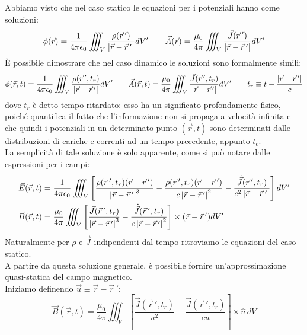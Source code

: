 \documentclass[]{article}
\begin{document}
Abbiamo visto che nel caso statico le equazioni per i potenziali hanno come soluzioni:
\begin{equation}
	\phi(\vec{r}) = \frac{1}{4\pi\epsilon_0} \iiint_V \frac{\rho(\vec{r}\,')}{\left\lvert\vec{r} - \vec{r}\,'\right\rvert} dV' \qquad \vec{A}(\vec{r}) = \frac{\mu_0}{4\pi} \iiint_V \frac{\vec{J}(\vec{r}\,')}{\left\lvert\vec{r} - \vec{r}\,'\right\rvert} dV'
	\label{eq:84}
\end{equation}
È possibile dimostrare che nel caso dinamico le soluzioni sono formalmente simili:
\begin{equation}
	\phi(\vec{r},t) = \frac{1}{4\pi\epsilon_0} \iiint_V \frac{\rho(\vec{r}\,', t_r)}{\left\lvert\vec{r} - \vec{r}\,'\right\rvert} dV' \qquad \vec{A}(\vec{r},t) = \frac{\mu_0}{4\pi} \iiint_V \frac{\vec{J}(\vec{r}\,',t_r)}{\left\lvert\vec{r} - \vec{r}\,'\right\rvert} dV' \qquad t_r \equiv t - \frac{\left\lvert\vec{r} - \vec{r}\,'\right\rvert}{c}
	\label{eq:85}
\end{equation}
dove $ t_r $ è detto tempo ritardato: esso ha un significato profondamente fisico, poiché quantifica il fatto che l'informazione non si propaga a velocità infinita e che quindi i potenziali in un determinato punto $ (\vec{r},t) $ sono determinati dalle distribuzioni di cariche e correnti ad un tempo precedente, appunto $ t_c $. \\ 
%
La semplicità di tale soluzione è solo apparente, come si può notare dalle espressioni per i campi:
\begin{align}
	\vec{E}(\vec{r},t) &= \frac{1}{4\pi \epsilon_0} \iiint_V \left[ \frac{\rho(\vec{r}\,', t_r) (\vec{r} - \vec{r}\,')}{\left\lvert\vec{r} - \vec{r}\,'\right\rvert^3} - \frac{\dot{\rho}(\vec{r}\,', t_r) (\vec{r} - \vec{r}\,')}{c \left\lvert\vec{r} - \vec{r}\,'\right\rvert^2} - \frac{\dot{\vec{J}}(\vec{r}\,', t_r)}{c^2 \left\lvert\vec{r} - \vec{r}\,'\right\rvert} \right] dV' \\ 
	\vec{B}(\vec{r},t) &= \frac{\mu_0}{4\pi} \iiint_V \left[ \frac{\vec{J}(\vec{r}\,', t_r)}{\left\lvert\vec{r} - \vec{r}\,'\right\rvert^3} - \frac{\dot{\vec{J}}(\vec{r}\,', t_r)}{c \left\lvert\vec{r} - \vec{r}\,'\right\rvert^2} \right] \times (\vec{r} - \vec{r}\,') dV'
	\label{eq:86-87}
\end{align}
Naturalmente per $ \rho $ e $ \vec{J} $ indipendenti dal tempo ritroviamo le equazioni del caso statico. \\ 
%
A partire da questa soluzione generale, è possibile fornire un'approssimazione quasi-statica del campo magnetico. \\ 
Iniziamo definendo $ \vec{u} \equiv \vec{r} - \vec{r}\,' $:
\begin{equation}
	\vec{B}(\vec{r},t) = \frac{\mu_0}{4\pi} \iiint_V \left[ \frac{\vec{J}(\vec{r}\,', t_r)}{u^2} + \frac{\dot{\vec{J}}(\vec{r}\,', t_r)}{cu} \right] \times \hat{u} \,dV
	\label{eq:88}
\end{equation}
\end{document}
